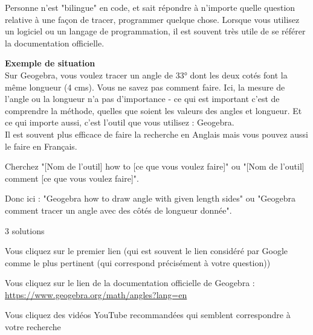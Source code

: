 \documentclass[answers]{exam}
\begin{document}
Personne n'est "bilingue" en code, et sait répondre à n'importe quelle question relative à une façon de tracer, programmer quelque chose. Lorsque vous utilisez un logiciel ou un langage de programmation, il est souvent très utile de se référer la documentation officielle. 

\vspace{1em}

\textbf{Exemple de situation} \\

Sur Geogebra, vous voulez tracer un angle de 33° dont les deux cotés font la même longueur (4 cms). Vous ne savez pas comment faire. Ici, la mesure de l'angle ou la longueur n'a pas d'importance - ce qui est important c'est de comprendre la méthode, quelles que soient les valeurs des angles et longueur.
Et ce qui importe aussi, c'est l'outil que vous utilisez : Geogebra. \\

Il est souvent plus efficace de faire la recherche en Anglais mais vous pouvez aussi le faire en Français. \\

\begin{compactitem}
  \item Cherchez "[Nom de l'outil] how to [ce que vous voulez faire]" ou "[Nom de l'outil] comment [ce que vous voulez faire]".
  \item Donc ici : "Geogebra how to draw angle with given length sides" ou "Geogebra comment tracer un angle avec des côtés de longueur donnée".
\end{compactitem}

\vspace{1em}

3 solutions

\begin{compactitem}
  \item Vous cliquez sur le premier lien (qui est souvent le lien considéré par Google comme le plus pertinent (qui correspond précisément à votre question))
  \item Vous cliquez sur le lien de la documentation officielle de Geogebra : \href{Geometry / Angles}{https://www.geogebra.org/math/angles?lang=en}
  \item Vous cliquez des vidéos YouTube recommandées qui semblent correspondre à votre recherche
\end{compactitem} 

\vspace{1em}
\end{document}
